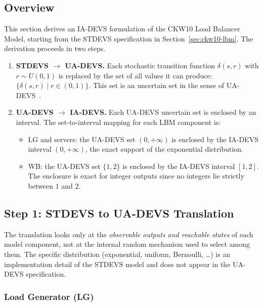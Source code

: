 \subsection*{Overview}

This section derives an IA-DEVS formulation of the CKW10 Load Balancer
Model, starting from the STDEVS specification in Section~\ref{sec:ckw10-lbm}.
The derivation proceeds in two steps.
\begin{enumerate}
  \item \textbf{STDEVS $\to$ UA-DEVS.}
        Each stochastic transition function $\delta(s,r)$ with $r \sim U(0,1)$
        is replaced by the set of all values it can produce:
        $\{\delta(s,r) \mid r \in (0,1)\}$.  This set is an uncertain set
        in the sense of UA-DEVS~\cite{VDW21}.
  \item \textbf{UA-DEVS $\to$ IA-DEVS.}
        Each UA-DEVS uncertain set is enclosed by an interval.
        The set-to-interval mapping for each LBM component is:
        \begin{itemize}
          \item LG and servers: the UA-DEVS set $(0,+\infty)$ is
            enclosed by the IA-DEVS interval $(0,+\infty)$,
            the exact support of the exponential distribution.
          \item WB: the UA-DEVS set $\{1,2\}$ is enclosed by the
            IA-DEVS interval $[1,2]$.  The enclosure is exact for
            integer outputs since no integers lie strictly between
            $1$ and $2$.
        \end{itemize}
\end{enumerate}

\subsection*{Step 1: STDEVS to UA-DEVS Translation}

The translation looks only at the \emph{observable outputs and reachable
states} of each model component, not at the internal random mechanism used
to select among them.  The specific distribution (exponential, uniform,
Bernoulli, \ldots) is an implementation detail of the STDEVS model and
does not appear in the UA-DEVS specification.

\subsubsection*{Load Generator (LG)}

